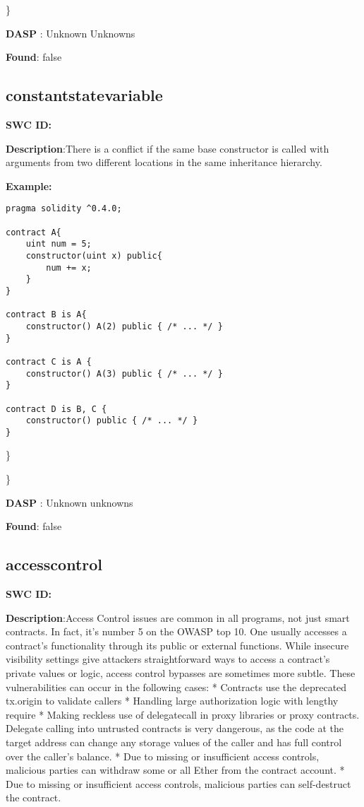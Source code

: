 \documentclass{article}
\begin{document}
\} 

\textbf{DASP} : Unknown Unknowns

\textbf{Found}: false

\subsection{constant\textunderscore state\textunderscore variable} 
\textbf{SWC \textunderscore ID:} 

\textbf{Description}:There is a conflict if the same base constructor is called with arguments from two different locations in the same inheritance hierarchy.


\textbf{Example:} 
\begin{verbatim}
pragma solidity ^0.4.0;

contract A{
    uint num = 5;
    constructor(uint x) public{
        num += x;
    }
}

contract B is A{
    constructor() A(2) public { /* ... */ }
}

contract C is A {
    constructor() A(3) public { /* ... */ }
}

contract D is B, C {
    constructor() public { /* ... */ }
}

\end{verbatim}\} 

\} 

\textbf{DASP} : Unknown unknowns

\textbf{Found}: false

\subsection{access\textunderscore control} 
\textbf{SWC \textunderscore ID:} 

\textbf{Description}:Access Control issues are common in all programs, not just smart contracts. In fact, it's number 5 on the OWASP top 10. One usually accesses a contract's functionality through its public or external functions. While insecure visibility settings give attackers straightforward ways to access a contract's private values or logic, access control bypasses are sometimes more subtle. These vulnerabilities can occur in the following cases:
* Contracts use the deprecated tx.origin to validate callers
* Handling large authorization logic with lengthy require
* Making reckless use of delegatecall in proxy libraries or proxy contracts. Delegate calling into untrusted contracts is very dangerous, as the code at the target address can change any storage values of the caller and has full control over the caller's balance.
* Due to missing or insufficient access controls, malicious parties can withdraw some or all Ether from the contract account.
* Due to missing or insufficient access controls, malicious parties can self-destruct the contract.
\end{document}
